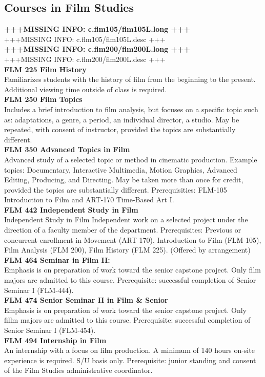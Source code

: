 \documentclass[
  letterpaper,
]{scrbook}
\begin{document}
\subsection{Courses in Film Studies}\label{courses-in-film-studies}

\textbf{+++MISSING INFO: c.flm105/flm105L.long +++}\\
+++MISSING INFO: c.flm105/flm105L.desc +++\\
\textbf{+++MISSING INFO: c.flm200/flm200L.long +++}\\
+++MISSING INFO: c.flm200/flm200L.desc +++\\
\textbf{FLM 225 Film History}\\
Familiarizes students with the history of film from the beginning to the
present. Additional viewing time outside of class is required.\\
\textbf{FLM 250 Film Topics}\\
Includes a brief introduction to film analysis, but focuses on a
specific topic such as: adaptations, a genre, a period, an individual
director, a studio. May be repeated, with consent of instructor,
provided the topics are substantially different.\\
\textbf{FLM 350 Advanced Topics in Film}\\
Advanced study of a selected topic or method in cinematic production.
Example topics: Documentary, Interactive Multimedia, Motion Graphics,
Advanced Editing, Producing, and Directing. May be taken more than once
for credit, provided the topics are substantially different.
Prerequisities: FLM-105 Introduction to Film and ART-170 Time-Based Art
I.\\
\textbf{FLM 442 Independent Study in Film}\\
Independent Study in Film Independent work on a selected project under
the direction of a faculty member of the department. Prerequisites:
Previous or concurrent enrollment in Movement (ART 170), Introduction to
Film (FLM 105), Film Analysis (FLM 200), Film History (FLM 225).
(Offered by arrangement)\\
\textbf{FLM 464 Seminar in Film II:}\\
Emphasis is on preparation of work toward the senior capstone project.
Only film majors are admitted to this course. Prerequisite: successful
completion of Senior Seminar I (FLM-444).\\
\textbf{FLM 474 Senior Seminar II in Film \& Senior}\\
Emphasis is on preparation of work toward the senior capstone project.
Only fillm majors are admitted to this course. Prerequisite: successful
completion of Senior Seminar I (FLM-454).\\
\textbf{FLM 494 Internship in Film}\\
An internship with a focus on film production. A minimum of 140 hours
on-site experience is required. S/U basis only. Prerequisite: junior
standing and consent of the Film Studies administrative coordinator.
\end{document}
